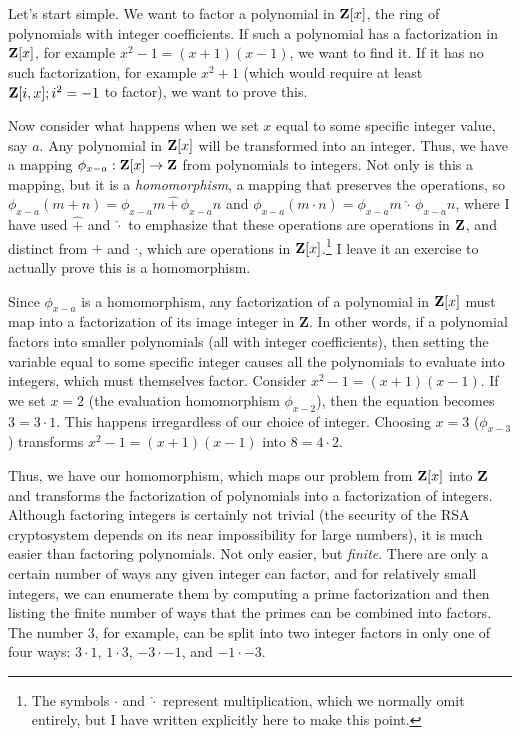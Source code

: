 Let's start simple.  We want to factor a polynomial in ${\bf Z}[x]$,
the ring of polynomials with integer coefficients.  If such a
polynomial has a factorization in ${\bf Z}[x]$, for example
$x^2-1=(x+1)(x-1)$, we want to find it.  If it has no such
factorization, for example $x^2+1$ (which would require at least ${\bf
Z}[i,x]; i^2=-1$ to factor), we want to prove this.

Now consider what happens when we set $x$ equal to some specific
integer value, say $a$.  Any polynomial in ${\bf Z}[x]$ will be
transformed into an integer.  Thus, we have a mapping $\phi_{x-a}:
{\bf Z}[x] \rightarrow {\bf Z}$ from polynomials to integers.  Not
only is this a mapping, but it is a {\it homomorphism}, a mapping that
preserves the operations, so $\phi_{x-a} (m+n) = \phi_{x-a}m \,\hat+\,
\phi_{x-a}n$ and $\phi_{x-a} (m\cdot n) = \phi_{x-a}m \,\hat\cdot\,
\phi_{x-a}n$, where I have used $\hat+$ and $\hat\cdot$ to emphasize
that these operations are operations in ${\bf Z}$, and distinct from
$+$ and $\cdot$, which are operations in ${\bf Z}[x]$.\footnote{The
symbols $\cdot$ and $\hat\cdot$ represent multiplication, which we normally
omit entirely, but I have written explicitly here to make this point.}
I leave it an exercise to actually prove this is a homomorphism.

Since $\phi_{x-a}$ is a homomorphism, any factorization of a
polynomial in ${\bf Z}[x]$ must map into a factorization of its image
integer in {\bf Z}.  In other words, if a polynomial factors into
smaller polynomials (all with integer coefficients), then setting the
variable equal to some specific integer causes all the polynomials to
evaluate into integers, which must themselves factor.  Consider
$x^2-1=(x+1)(x-1)$.  If we set $x=2$ (the evaluation homomorphism
$\phi_{x-2}$), then the equation becomes $3=3\cdot1$.  This happens
irregardless of our choice of integer.  Choosing $x=3$ ($\phi_{x-3}$)
transforms $x^2-1=(x+1)(x-1)$ into $8=4\cdot2$.

Thus, we have our homomorphism, which maps our problem from ${\bf
Z}[x]$ into ${\bf Z}$ and transforms the factorization of polynomials
into a factorization of integers.  Although factoring integers is
certainly not trivial (the security of the RSA cryptosystem depends on
its near impossibility for large numbers), it is much easier than
factoring polynomials.  Not only easier, but {\it finite}.  There are
only a certain number of ways any given integer can factor, and for
relatively small integers, we can enumerate them by computing a prime
factorization and then listing the finite number of ways that the
primes can be combined into factors.  The number $3$, for example, can
be split into two integer factors in only one of four ways: $3\cdot1$,
$1\cdot3$, $-3\cdot-1$, and $-1\cdot-3$.

